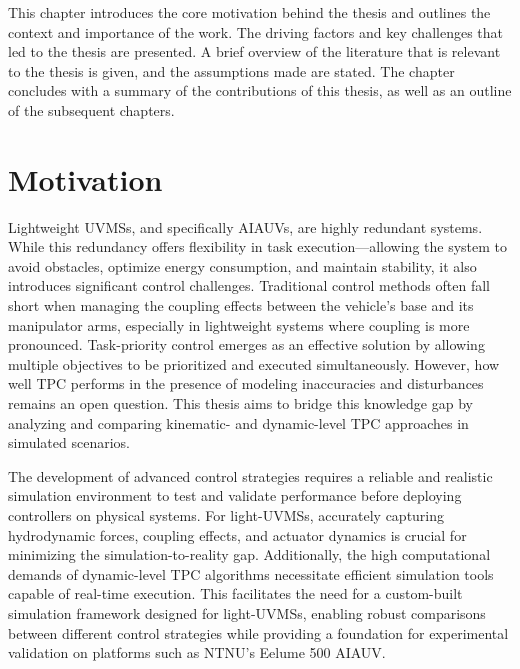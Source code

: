 This chapter introduces the core motivation behind the thesis and outlines the
context and importance of the work. The driving factors and key challenges that
led to the thesis are presented. A brief overview of the literature that is
relevant to the thesis is given, and the assumptions made are
stated. The chapter concludes with a summary of the contributions of this thesis,
as well as an outline of the subsequent chapters.


\section{Motivation}

\iffalse
{
    \color{red}
    \begin{itemize}
        \item Highly redundant systems $\rightarrow$ Task-priority control
        \item Inaccurate models? How good is TPC for light-UVMS?
            \begin{itemize}
                \item Kinetic vs Dynamic redundancy resolution
            \end{itemize}
        \item Need for realistic simulations and dynamic models when comparing TPC methods
    \end{itemize}
}
\fi
Lightweight UVMSs, and specifically AIAUVs, are highly redundant systems.
While this redundancy offers flexibility in task execution—allowing the system
to avoid obstacles, optimize 
energy consumption, and maintain stability, it also introduces significant 
control challenges. Traditional control methods often fall short when managing 
the coupling effects between the vehicle's base and its manipulator arms, 
especially in lightweight systems where coupling is more pronounced. 
Task-priority control emerges as an effective solution by allowing 
multiple objectives to be prioritized and executed simultaneously. However, how 
well TPC performs in the presence of modeling inaccuracies and disturbances 
remains an open question. This thesis aims to bridge this knowledge gap by 
analyzing and comparing kinematic- and dynamic-level TPC approaches in
simulated scenarios.

The development of advanced control strategies requires a reliable and 
realistic simulation environment to test and validate performance before 
deploying controllers on physical systems. For light-UVMSs, accurately 
capturing hydrodynamic forces, coupling effects, and actuator dynamics is 
crucial for minimizing the simulation-to-reality gap. Additionally, the high 
computational demands of dynamic-level TPC algorithms necessitate efficient 
simulation tools capable of real-time execution. This facilitates the
need for a custom-built simulation framework designed for light-UVMSs, 
enabling robust comparisons between different control strategies while 
providing a foundation for experimental validation on platforms such as NTNU’s 
Eelume 500 AIAUV.

